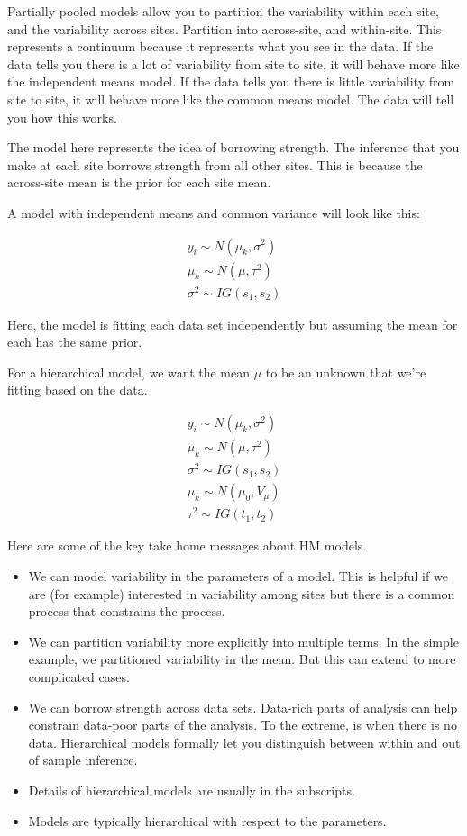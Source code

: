 \documentclass[12pt, oneside]{article}   	%
\begin{document}
Partially pooled models allow you to partition the variability within each site, and the variability across sites. Partition into across-site, and within-site. This represents a continuum because it represents what you see in the data. If the data tells you there is a lot of variability from site to site, it will behave more like the independent means model.  If the data tells you there is little variability from site to site, it will behave more like the common means model. The data will tell you how this works.

The model here represents the idea of borrowing strength. The inference that you make at each site borrows strength from all other sites. This is because the across-site mean is the prior for each site mean.

A model with independent means and common variance will look like this:

\begin{align}
 y_i \sim N(\mu_k, \sigma^2) \\
 \mu_k \sim N(\mu, \tau^2) \\
 \sigma^2 \sim IG(s_1, s_2) 
\end{align}

Here, the model is fitting each data set independently but assuming the mean for each has the same prior. 

For a hierarchical model, we want the mean $\mu$ to be an unknown that we're fitting based on the data.

\begin{align}
 y_i \sim N(\mu_k, \sigma^2) \\
 \mu_k \sim N(\mu, \tau^2) \\
 \sigma^2 \sim IG(s_1, s_2) \\
  \mu_k \sim N(\mu_0, V_{\mu}) \\
\tau^2 \sim IG(t_1, t_2)
\end{align}

Here are some of the key take home messages about HM models.

\begin{itemize}
\item We can model variability in the parameters of a model. This is helpful if we are (for example) interested in variability among sites but there is a common process that constrains the process.
\item We can partition variability more explicitly into multiple terms. In the simple example, we partitioned variability in the mean. But this can extend to more complicated cases. 
\item We can borrow strength across data sets. Data-rich parts of analysis can help constrain data-poor parts of the analysis. To the extreme, is when there is no data. Hierarchical models formally let you distinguish between within and out of sample inference. 
\item Details of hierarchical models are usually in the subscripts.
\item Models are typically hierarchical with respect to the parameters. 
\end{itemize}
\end{document}
